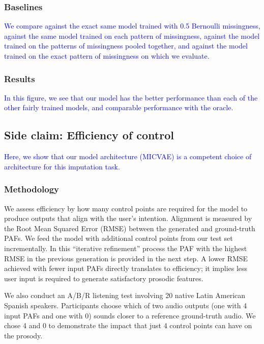 \documentclass[a4paper,12pt,twoside,openright]{article}
\newcommand{\draft}[1]{\textcolor{blue}{#1}}
\begin{document}
\subsubsection{Baselines}

\draft{We compare against the exact same model trained with 0.5 Bernoulli missingness, against the same model trained on each pattern of missingness, against the model trained on the patterns of missingness pooled together, and against the model trained on the exact pattern of missingness on which we evaluate.}

\subsubsection{Results}

\draft{In this figure, we see that our model has the better performance than each of the other fairly trained models, and comparable performance with the oracle.}

\subsection{Side claim: Efficiency of control}

\draft{Here, we show that our model architecture (MICVAE) is a competent choice of architecture for this imputation task.}

\subsubsection{Methodology}

We assess efficiency by how many control points are required for the model to produce outputs that align with the user's intention. Alignment is measured by the Root Mean Squared Error (RMSE) between the generated and ground-truth PAFs. We feed the model with additional control points from our test set incrementally. In this ``iterative refinement'' process the PAF with the highest RMSE in the previous generation is provided in the next step. A lower RMSE achieved with fewer input PAFs directly translates to efficiency; it implies less user input is required to generate satisfactory prosodic features.

We also conduct an A/B/R listening test involving 20 native Latin American Spanish speakers. Participants choose which of two audio outputs (one with 4 input PAFs and one with 0) sounds closer to a reference ground-truth audio. We chose 4 and 0 to demonstrate the impact that just 4 control points can have on the prosody.
\end{document}
